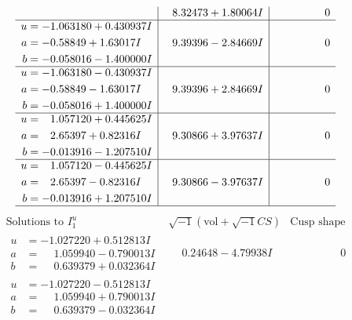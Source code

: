 \documentclass[1p]{elsarticle_modified}
\theoremstyle{definition}
\newcommand{\I}{\sqrt{-1}}
\begin{document}
$$\begin{array}{c|c|c}
 & \phantom{-}8.32473 + 1.80064 I & \phantom{-0.000000 } 0 \\ \hline\begin{aligned}
u &= -1.063180 + 0.430937 I \\
a &= -0.58849 + 1.63017 I \\
b &= -0.058016 - 1.400000 I\end{aligned}
 & \phantom{-}9.39396 - 2.84669 I & \phantom{-0.000000 } 0 \\ \hline\begin{aligned}
u &= -1.063180 - 0.430937 I \\
a &= -0.58849 - 1.63017 I \\
b &= -0.058016 + 1.400000 I\end{aligned}
 & \phantom{-}9.39396 + 2.84669 I & \phantom{-0.000000 } 0 \\ \hline\begin{aligned}
u &= \phantom{-}1.057120 + 0.445625 I \\
a &= \phantom{-}2.65397 + 0.82316 I \\
b &= -0.013916 - 1.207510 I\end{aligned}
 & \phantom{-}9.30866 + 3.97637 I & \phantom{-0.000000 } 0 \\ \hline\begin{aligned}
u &= \phantom{-}1.057120 - 0.445625 I \\
a &= \phantom{-}2.65397 - 0.82316 I \\
b &= -0.013916 + 1.207510 I\end{aligned}
 & \phantom{-}9.30866 - 3.97637 I & \phantom{-0.000000 } 0\\
 \hline 
 \end{array}$$\newpage$$\begin{array}{c|c|c}  
\text{Solutions to }I^u_{1}& \I (\text{vol} + \sqrt{-1}CS) & \text{Cusp shape}\\
 \hline 
\begin{aligned}
u &= -1.027220 + 0.512813 I \\
a &= \phantom{-}1.059940 - 0.790013 I \\
b &= \phantom{-}0.639379 + 0.032364 I\end{aligned}
 & \phantom{-}0.24648 - 4.79938 I & \phantom{-0.000000 } 0 \\ \hline\begin{aligned}
u &= -1.027220 - 0.512813 I \\
a &= \phantom{-}1.059940 + 0.790013 I \\
b &= \phantom{-}0.639379 - 0.032364 I\end{aligned}

\end{array}$$
\end{document}
